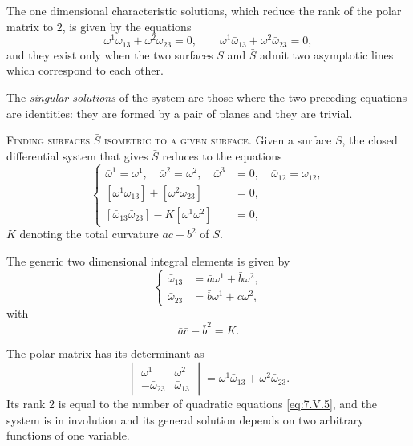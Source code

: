 \documentclass[leqno,11pt]{book}
\numberwithin{equation}{chapter}
\theoremstyle{shape1}
\theoremstyle{shape0}
\theoremstyle{shape2}
\theoremstyle{definition}
\begin{document}
The one dimensional characteristic solutions, which reduce the rank of the polar matrix to $2$, is given by the equations
\[
\omega^{1}\omega_{13}+\omega^{2}\omega_{23}=0,\qquad\omega^{1}\bar\omega_{13}+\omega^{2}\bar\omega_{23}=0,
\]
and they exist only when the two surfaces $S$ and $\bar S$ admit two asymptotic lines which correspond to each other.

The \emph{singular solutions} of the system are those where the two preceding equations are identities: they are formed by a pair of planes and they are trivial.


\vspace{12pt}\fsec\textsc{Finding surfaces $\bar S$ isometric to a given surface.} Given a surface $S$, the closed differential system that gives $\bar S$ reduces to the equations\label{s20}
\begin{equation}
  \label{eq:7.V.5}\tag{V, 5}
  \left\{
    \begin{aligned}
      \bar\omega^{1}=\omega^{1},\quad\bar\omega^{2}=\omega^{2},\quad\bar\omega^{3}&=0,\quad\bar\omega_{12}=\omega_{12},\\
      [\omega^{1}\bar\omega_{13}]+[\omega^{2}\bar\omega_{23}]&=0,\\
      [\bar\omega_{13}\bar\omega_{23}]-K[\omega^{1}\omega^{2}]&=0,
    \end{aligned}
  \right.
\end{equation}
$K$ denoting the total curvature $ac-b^{2}$ of $S$.

The generic two dimensional integral elements is given by
\begin{equation}
  \label{eq:7.V.6}\tag{V, 6}
  \left\{
    \begin{aligned}
      \bar\omega_{13}&=\bar a\omega^{1}+\bar b\omega^{2},\\
      \bar\omega_{23}&=\bar b\omega^{1}+\bar c\omega^{2},
    \end{aligned}
  \right.
\end{equation}
with
\begin{equation}
  \label{eq:7.V.7}\tag{V, 7}
  \bar{a}\bar{c}-\bar b^{2}=K.
\end{equation}

The polar matrix has its determinant as
\[
\begin{vmatrix}
  \omega^{1}&\omega^{2}\\
  -\bar\omega_{23}&\bar\omega_{13}
\end{vmatrix}
=\omega^{1}\bar\omega_{13}+\omega^{2}\bar\omega_{23}.
\]
Its rank $2$ is equal to the number of quadratic equations \eqref{eq:7.V.5}, and the system is in involution and its general solution depends on two arbitrary functions of one variable.
\end{document}
